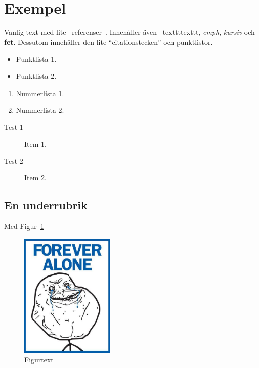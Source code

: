 \documentclass[conference,a4paper]{IEEEtran}
\begin{document}
\section{Exempel}
Vanlig text med lite~\cite{biggs84} referenser~\cite{web:pox}. Innehåller även \
texttt{texttt}, \emph{emph}, \textit{kursiv} och \textbf{fet}. Dessutom innehåller
den lite ``citationstecken'' och punktlistor.
\begin{itemize}
\item Punktlista 1.
\item Punktlista 2.
\end{itemize}
\begin{enumerate}
\item Nummerlista 1.
\item Nummerlista 2.
\end{enumerate}
\begin{description}
\item[Test 1] Item 1.
\item[Test 2] Item 2.
\end{description}
\subsection{En underrubrik}
Med Figur~\ref{fig1}
\begin{figure}
\center
\includegraphics[width=0.4\textwidth]{forver_alone.jpg}
\caption{Figurtext}
\label{fig1}
\end{figure}
\printbibliography
\end{document}
